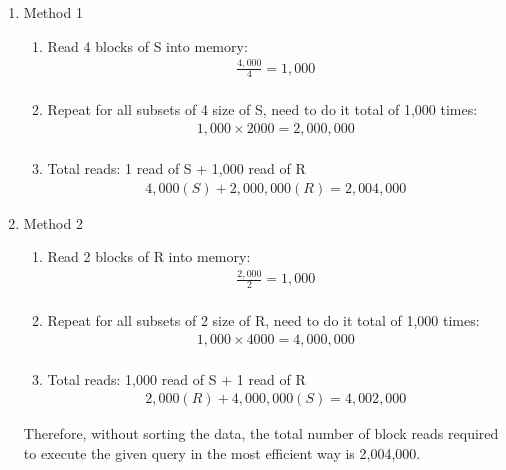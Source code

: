 \documentclass[12pt]{extarticle}
\begin{document}
\begin{flushleft}
\begin{enumerate}
\begin{enumerate}
\item Method 1

\begin{enumerate}
\item Read 4 blocks of S into memory:
\begin{align*}
    \frac{4,000}{4} = 1,000 \\
\end{align*}


\item Repeat for all subsets of 4 size of S, need to do it total of 1,000 times:
\begin{align*}
    1,000 \times 2000 = 2,000,000 \\
\end{align*}

\item Total reads: 1 read of S + 1,000 read of R\\
\begin{align*}
    4,000 (S) + 2,000,000 (R) = \boxed{2,004,000}
\end{align*}
\end{enumerate}

\item Method 2

\begin{enumerate}
\item Read 2 blocks of R into memory:
\begin{align*}
    \frac{2,000}{2} = 1,000 \\
\end{align*}


\item Repeat for all subsets of 2 size of R, need to do it total of 1,000 times:
\begin{align*}
    1,000 \times 4000 = 4,000,000 \\
\end{align*}

\item Total reads: 1,000 read of S + 1 read of R\\
\begin{align*}
    2,000 (R) + 4,000,000 (S) = \boxed{4,002,000}
\end{align*}
\end{enumerate}


Therefore, without sorting the data, the total number of block reads required to execute the given query in the most efficient way is 2,004,000.

\end{enumerate}

\end{enumerate}
\end{flushleft}
\end{document}

